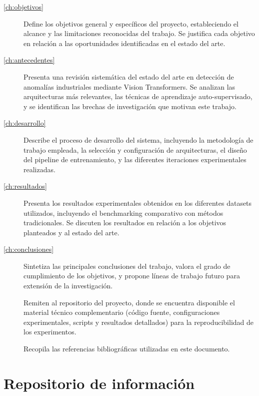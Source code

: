 \begin{description}
    \item[\autoref{ch:objetivos}] Define los objetivos general y específicos del proyecto, estableciendo el alcance y las limitaciones reconocidas del trabajo. Se justifica cada objetivo en relación a las oportunidades identificadas en el estado del arte.
    
    \item[\autoref{ch:antecedentes}] Presenta una revisión sistemática del estado del arte en detección de anomalías industriales mediante Vision Transformers. Se analizan las arquitecturas más relevantes, las técnicas de aprendizaje auto-supervisado, y se identifican las brechas de investigación que motivan este trabajo.
    
    \item[\autoref{ch:desarrollo}] Describe el proceso de desarrollo del sistema, incluyendo la metodología de trabajo empleada, la selección y configuración de arquitecturas, el diseño del pipeline de entrenamiento, y las diferentes iteraciones experimentales realizadas.
    
    \item[\autoref{ch:resultados}] Presenta los resultados experimentales obtenidos en los diferentes datasets utilizados, incluyendo el benchmarking comparativo con métodos tradicionales. Se discuten los resultados en relación a los objetivos planteados y al estado del arte.
    
    \item[\autoref{ch:conclusiones}] Sintetiza las principales conclusiones del trabajo, valora el grado de cumplimiento de los objetivos, y propone líneas de trabajo futuro para extensión de la investigación.
    
    \item[] Remiten al repositorio del proyecto, donde se encuentra disponible el material técnico complementario (código fuente, configuraciones experimentales, scripts y resultados detallados) para la reproducibilidad de los experimentos.
    
    \item[] Recopila las referencias bibliográficas utilizadas en este documento.
\end{description}


\section{Repositorio de información}
\label{sec:repositorio}

